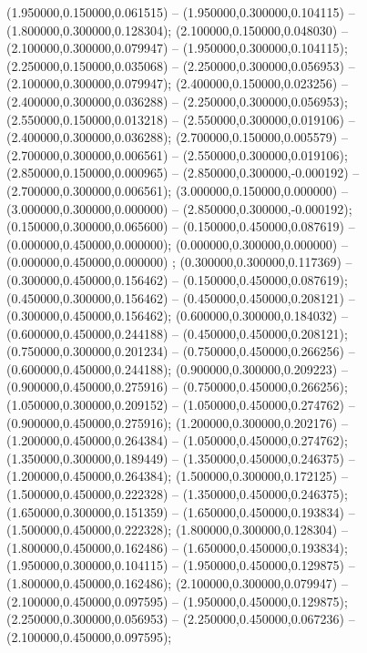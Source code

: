  (1.950000,0.150000,0.061515) -- (1.950000,0.300000,0.104115) -- (1.800000,0.300000,0.128304);
 (2.100000,0.150000,0.048030) -- (2.100000,0.300000,0.079947) -- (1.950000,0.300000,0.104115);
 (2.250000,0.150000,0.035068) -- (2.250000,0.300000,0.056953) -- (2.100000,0.300000,0.079947);
 (2.400000,0.150000,0.023256) -- (2.400000,0.300000,0.036288) -- (2.250000,0.300000,0.056953);
 (2.550000,0.150000,0.013218) -- (2.550000,0.300000,0.019106) -- (2.400000,0.300000,0.036288);
 (2.700000,0.150000,0.005579) -- (2.700000,0.300000,0.006561) -- (2.550000,0.300000,0.019106);
 (2.850000,0.150000,0.000965) -- (2.850000,0.300000,-0.000192) -- (2.700000,0.300000,0.006561);
 (3.000000,0.150000,0.000000) -- (3.000000,0.300000,0.000000) -- (2.850000,0.300000,-0.000192);
 (0.150000,0.300000,0.065600) -- (0.150000,0.450000,0.087619) -- (0.000000,0.450000,0.000000);
 (0.000000,0.300000,0.000000) -- (0.000000,0.450000,0.000000) ;
 (0.300000,0.300000,0.117369) -- (0.300000,0.450000,0.156462) -- (0.150000,0.450000,0.087619);
 (0.450000,0.300000,0.156462) -- (0.450000,0.450000,0.208121) -- (0.300000,0.450000,0.156462);
 (0.600000,0.300000,0.184032) -- (0.600000,0.450000,0.244188) -- (0.450000,0.450000,0.208121);
 (0.750000,0.300000,0.201234) -- (0.750000,0.450000,0.266256) -- (0.600000,0.450000,0.244188);
 (0.900000,0.300000,0.209223) -- (0.900000,0.450000,0.275916) -- (0.750000,0.450000,0.266256);
 (1.050000,0.300000,0.209152) -- (1.050000,0.450000,0.274762) -- (0.900000,0.450000,0.275916);
 (1.200000,0.300000,0.202176) -- (1.200000,0.450000,0.264384) -- (1.050000,0.450000,0.274762);
 (1.350000,0.300000,0.189449) -- (1.350000,0.450000,0.246375) -- (1.200000,0.450000,0.264384);
 (1.500000,0.300000,0.172125) -- (1.500000,0.450000,0.222328) -- (1.350000,0.450000,0.246375);
 (1.650000,0.300000,0.151359) -- (1.650000,0.450000,0.193834) -- (1.500000,0.450000,0.222328);
 (1.800000,0.300000,0.128304) -- (1.800000,0.450000,0.162486) -- (1.650000,0.450000,0.193834);
 (1.950000,0.300000,0.104115) -- (1.950000,0.450000,0.129875) -- (1.800000,0.450000,0.162486);
 (2.100000,0.300000,0.079947) -- (2.100000,0.450000,0.097595) -- (1.950000,0.450000,0.129875);
 (2.250000,0.300000,0.056953) -- (2.250000,0.450000,0.067236) -- (2.100000,0.450000,0.097595);
